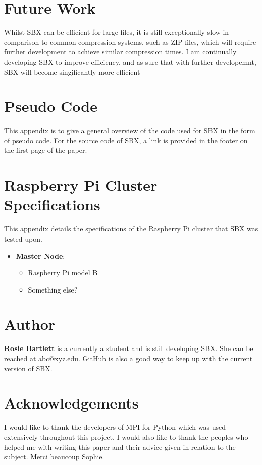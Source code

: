 \documentclass{hehe}
\begin{document}
\section{Future Work}

Whilst SBX can be efficient for large files, it is still exceptionally slow in comparison to common compression systems, such as ZIP files, which will require further development to achieve similar compression times. I am continually developing SBX to improve efficiency, and as sure that with further developemnt, SBX will become singificantly more efficient

\appendix
\section{Pseudo Code}

This appendix is to give a general overview of the code used for SBX in the form of pseudo code. For the source code of SBX, a link is provided in the footer on the first page of the paper.


\section{Raspberry Pi Cluster Specifications}
This appendix details the specifications of the Raspberry Pi cluster that SBX was tested upon.

\begin{itemize}
  \item \textbf{Master Node}:\\
  \begin{itemize}
    \item Raspberry Pi model B
    \item Something else?
  \end{itemize}
\end{itemize}

\section*{Author}
\begin{authorbio}

\textbf{Rosie Bartlett} is a currently a student and is still developing SBX. She can be reached at abc@xyz.edu. GitHub is also a good way to keep up with the current version of SBX.
\end{authorbio}

\section*{Acknowledgements}
I would like to thank the developers of MPI for Python \cite{DALCIN20051108} which was used extensively throughout this project. I would also like to thank the peoples who helped me with writing this paper and their advice given in relation to the subject. Merci beaucoup Sophie.

\printbibliography
\end{document}
